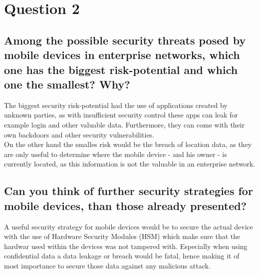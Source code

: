 \documentclass{report}
\begin{document}
	\section{Question 2}
	\startsection
		\renewcommand{\thesubsection}{\thesection.\Alph{subsection}}
		\subsection{Among the possible security threats posed by mobile devices in enterprise networks, which one has the biggest risk-potential and which one the smallest? Why?}
		\startsubsection
			The biggest security risk-potential had the use of applications created by unknown parties, as with insufficient security control these apps can leak for example login and other valuable data. Furthermore, they can come with their own backdoors and other security vulnerabilities. \\
			On the other hand the smalles risk would be the breach of location data, as they are only useful to determine where the mobile device - and his owner - is currently located, as this information is not the valuable in an enterprise network.
		\closesection
		
		\subsection{Can you think of further security strategies for mobile devices, than those already presented?}
		\startsubsection
			A useful security strategy for mobile devices would be to secure the actual device with the use of Hardware Security Modules (HSM) which make sure that the hardwar used within the devices was not tampered with. Especially when using confidential data a data leakage or breach would be fatal, hence making it of most importance to secure those data against any malicious attack.
		\closesection
	\closesection
\end{document}
